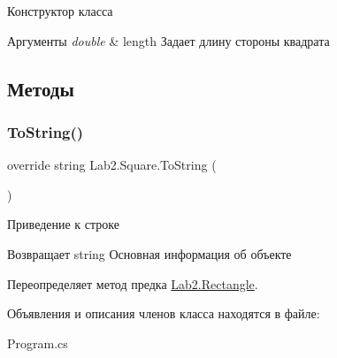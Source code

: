 Конструктор класса 
\begin{DoxyParams}{Аргументы}
{\em double} & length Задает длину стороны квадрата \\
\hline
\end{DoxyParams}


\subsection{Методы}
\mbox{\label{class_lab2_1_1_square_ac43e17280bb521a3466a38ec0e4742eb}} 
\subsubsection{\texorpdfstring{To\+String()}{ToString()}}
{\footnotesize\ttfamily override string Lab2.\+Square.\+To\+String (\begin{DoxyParamCaption}{ }\end{DoxyParamCaption})\hspace{0.3cm}{\ttfamily [virtual]}}

Приведение к строке \begin{DoxyReturn}{Возвращает}
string Основная информация об объекте 
\end{DoxyReturn}


Переопределяет метод предка \hyperlink{class_lab2_1_1_rectangle_a6c03cbd28985951c1c167b51ed47cdd4}{Lab2.\+Rectangle}.



Объявления и описания членов класса находятся в файле\+:\begin{DoxyCompactItemize}
\item 
Program.\+cs\end{DoxyCompactItemize}
